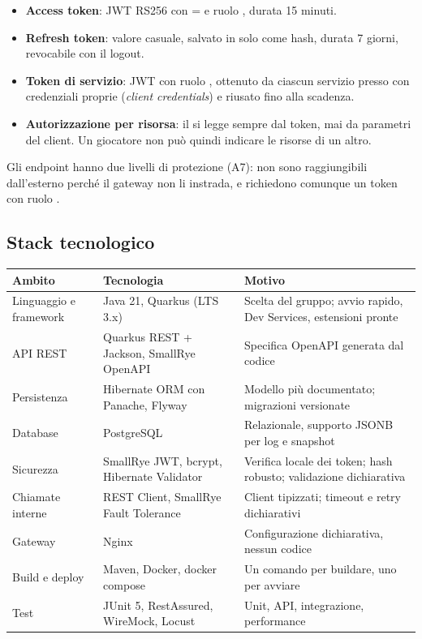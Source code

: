 \documentclass[11pt,a4paper]{article}
\begin{document}
\begin{itemize}
  \item \textbf{Access token}: JWT RS256 con  =  e ruolo , durata 15 minuti.
  \item \textbf{Refresh token}: valore casuale, salvato in  solo come hash, durata 7 giorni, revocabile con il logout.
  \item \textbf{Token di servizio}: JWT con ruolo , ottenuto da ciascun servizio presso  con credenziali proprie (\emph{client credentials}) e riusato fino alla scadenza.
  \item \textbf{Autorizzazione per risorsa}: il  si legge sempre dal token, mai da parametri del client. Un giocatore non può quindi indicare le risorse di un altro.
\end{itemize}

Gli endpoint  hanno due livelli di protezione (A7): non sono raggiungibili dall'esterno perché il gateway non li instrada, e richiedono comunque un token con ruolo .

\subsection{Stack tecnologico}

\begin{tabularx}{\linewidth}{@{}L{3.2cm}L{4.4cm}Y@{}}
  \toprule
  Ambito & Tecnologia & Motivo \\
  \midrule
  Linguaggio e framework & Java 21, Quarkus (LTS 3.x) & Scelta del gruppo; avvio rapido, Dev Services, estensioni pronte \\
  API REST & Quarkus REST + Jackson, SmallRye OpenAPI & Specifica OpenAPI generata dal codice \\
  Persistenza & Hibernate ORM con Panache, Flyway & Modello più documentato; migrazioni versionate \\
  Database & PostgreSQL & Relazionale, supporto JSONB per log e snapshot \\
  Sicurezza & SmallRye JWT, bcrypt, Hibernate Validator & Verifica locale dei token; hash robusto; validazione dichiarativa \\
  Chiamate interne & REST Client, SmallRye Fault Tolerance & Client tipizzati; timeout e retry dichiarativi \\
  Gateway & Nginx & Configurazione dichiarativa, nessun codice \\
  Build e deploy & Maven, Docker, docker compose & Un comando per buildare, uno per avviare \\
  Test & JUnit 5, RestAssured, WireMock, Locust & Unit, API, integrazione, performance \\
  \bottomrule
\end{tabularx}
\end{document}
